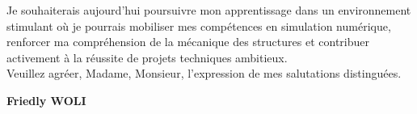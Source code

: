 \documentclass[11pt,a4paper]{article}
\begin{document}
			Je souhaiterais aujourd’hui poursuivre mon apprentissage dans un environnement stimulant où je pourrais mobiliser mes compétences en simulation numérique, renforcer ma compréhension de la mécanique des structures et contribuer activement à la réussite de projets techniques ambitieux.\\
			
			Veuillez agréer, Madame, Monsieur, l’expression de mes salutations distinguées.
	
	
	
	\vspace{0.8cm}
	
	
	
	
	
	
	\begin{flushright}
		
		\textbf{Friedly WOLI}
	\end{flushright}
	
	
\end{document}
